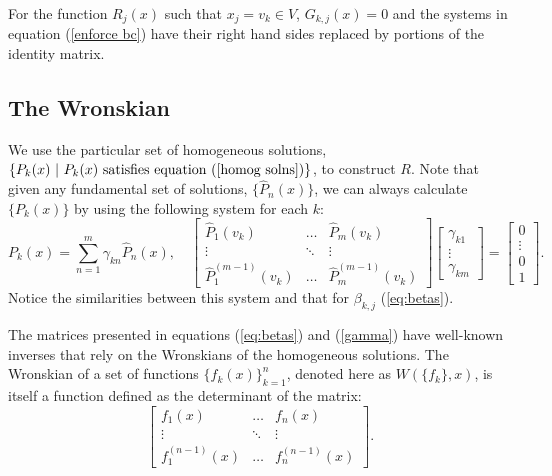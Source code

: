 \documentclass{book}
\begin{document}
For the function $R_j(x)$ such that $x_j = v_k \in V$, $G_{k,j}(x) = 0$ and the systems in equation (\ref{enforce bc}) have their right hand sides replaced by portions of the identity matrix.

\subsection{The Wronskian}

We use the particular set of homogeneous solutions, $\{ P_k(x) \ | \ P_k(x) \ \text{satisfies equation} \ (\ref{homog solns}) \}$, to construct $R$.
Note that given any fundamental set of solutions, $\{ \hat{P}_n(x) \}$, we can always calculate $\{ P_k(x) \}$ by using the following system for each $k$:
\begin{equation} \label{gamma}
P_k(x) = \sum_{n=1}^m \gamma_{kn} \hat{P}_n(x), \quad 
\begin{bmatrix} \hat{P}_1(v_k) & \dots & \hat{P}_m(v_k)
\\ \vdots & \ddots & \vdots
\\ \hat{P}_1^{(m-1)}(v_k) & \dots & \hat{P}_m^{(m-1)}(v_k) \end{bmatrix}
\begin{bmatrix} \gamma_{k1} \\ \vdots \\ \gamma_{km} \end{bmatrix} =
\begin{bmatrix} 0 \\ \vdots \\ 0 \\ 1 \end{bmatrix} .
\end{equation}
Notice the similarities between this system and that for $\beta_{k,j}$ (\ref{eq:betas}).

The matrices presented in equations (\ref{eq:betas}) and (\ref{gamma}) have well-known inverses that rely on the Wronskians of the homogeneous solutions.
The Wronskian of a set of functions $\{ f_k(x) \}_{k=1}^n$, denoted here as $W( \{ f_k \}, x)$, is itself a function defined as the determinant of the matrix:
\begin{equation}
\begin{bmatrix} f_1(x) & \dots & f_n(x) \\ \vdots & \ddots & \vdots \\ f^{(n-1)}_1(x) & \dots & f_n^{(n-1)}(x) \end{bmatrix} .
\end{equation}
\end{document}

